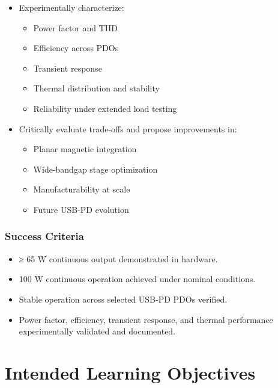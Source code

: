 \documentclass[12pt,a4paper]{report}
\begin{document}
\begin{itemize}
    \item Experimentally characterize:
    \begin{itemize}
        \item Power factor and THD
        \item Efficiency across PDOs
        \item Transient response
        \item Thermal distribution and stability
        \item Reliability under extended load testing
    \end{itemize}

    \item Critically evaluate trade-offs and propose improvements in:
    \begin{itemize}
        \item Planar magnetic integration
        \item Wide-bandgap stage optimization
        \item Manufacturability at scale
        \item Future USB-PD evolution
    \end{itemize}
\end{itemize}

\subsection*{Success Criteria}

\begin{itemize}
    \item ≥ 65 W continuous output demonstrated in hardware.
    \item 100 W continuous operation achieved under nominal conditions.
    \item Stable operation across selected USB-PD PDOs verified.
    \item Power factor, efficiency, transient response, and thermal performance experimentally validated and documented.
\end{itemize}

\chapter{Intended Learning Objectives}
\end{document}

